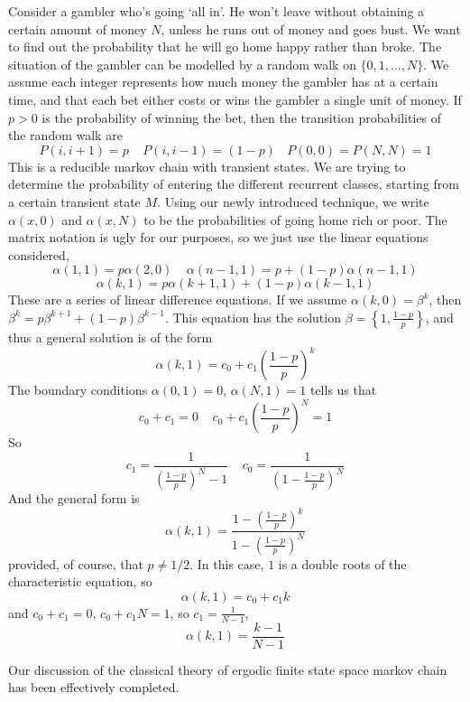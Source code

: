 \begin{example}
    Consider a gambler who's going `all in'. He won't leave without obtaining a certain amount of money $N$, unless he runs out of money and goes bust. We want to find out the probability that he will go home happy rather than broke. The situation of the gambler can be modelled by a random walk on $\{ 0,1, \dots, N \}$. We assume each integer represents how much money the gambler has at a certain time, and that each bet either costs or wins the gambler a single unit of money. If $p > 0$ is the probability of winning the bet, then the transition probabilities of the random walk are
    \[ P(i,i+1) = p\ \ \ \ \ P(i,i-1) = (1 - p)\ \ \ \ P(0,0) = P(N,N) = 1 \]
    This is a reducible markov chain with transient states. We are trying to determine the probability of entering the different recurrent classes, starting from a certain transient state $M$. Using our newly introduced technique, we write $\alpha(x,0)$ and $\alpha(x,N)$ to be the probabilities of going home rich or poor. The matrix notation is ugly for our purposes, so we just use the linear equations considered,
    \[ \alpha(1,1) = p\alpha(2,0) \ \ \ \ \ \alpha(n-1,1) = p + (1-p)\alpha(n-1,1) \]
    \[ \alpha(k,1) = p\alpha(k+1,1) + (1-p)\alpha(k-1,1) \]
    These are a series of linear difference equations. If we assume $\alpha(k,0) = \beta^k$, then $\beta^k = p\beta^{k+1} + (1-p)\beta^{k-1}$. This equation has the solution $\beta = \left\{ 1, \frac{1-p}{p} \right\}$, and thus a general solution is of the form
    \[ \alpha(k,1) = c_0 + c_1 \left( \frac{1-p}{p} \right)^k \]
    The boundary conditions $\alpha(0,1) = 0$, $\alpha(N,1) = 1$ tells us that
    \[ c_0 + c_1 = 0\ \ \ \ \ c_0 + c_1 \left( \frac{1-p}{p} \right)^N = 1 \]
    So
    \[ c_1 = \frac{1}{\left( \frac{1-p}{p} \right)^N - 1 }\ \ \ \ \ c_0 = \frac{1}{\left( 1 - \frac{1-p}{p} \right)^N} \]
    And the general form is
    \[ \alpha(k,1) = \frac{1 - \left( \frac{1-p}{p} \right)^k}{1 - \left( \frac{1-p}{p} \right)^N} \]
    provided, of course, that $p \neq 1/2$. In this case, $1$ is a double roots of the characteristic equation, so
    \[ \alpha(k,1) = c_0 + c_1 k \]
    and $c_0 + c_1 = 0$, $c_0 + c_1 N = 1$, so $c_1 = \frac{1}{N-1}$,
    \[ \alpha(k,1) = \frac{k-1}{N-1} \]
\end{example}

Our discussion of the classical theory of ergodic finite state space markov chain has been effectively completed.



